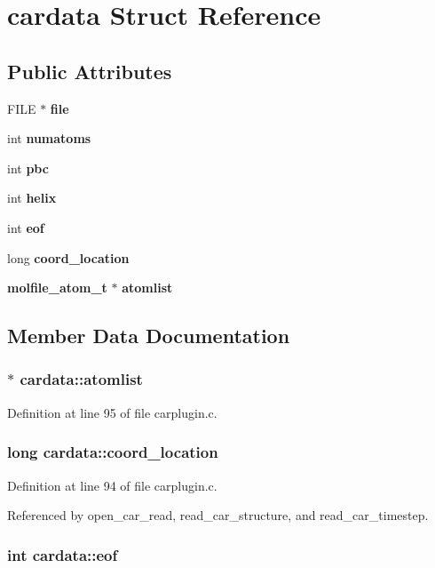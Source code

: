 \section{cardata  Struct Reference}
\label{structcardata}
\subsection*{Public Attributes}
\begin{CompactItemize}
\item 
FILE $\ast$ {\bf file}
\item 
int {\bf numatoms}
\item 
int {\bf pbc}
\item 
int {\bf helix}
\item 
int {\bf eof}
\item 
long {\bf coord\_\-location}
\item 
{\bf molfile\_\-atom\_\-t} $\ast$ {\bf atomlist}
\end{CompactItemize}


\subsection{Member Data Documentation}
\subsubsection{$\ast$ cardata::atomlist}\label{structcardata_m6}




Definition at line 95 of file carplugin.c.
\subsubsection{\setlength{\rightskip}{0pt plus 5cm}long cardata::coord\_\-location}\label{structcardata_m5}




Definition at line 94 of file carplugin.c.

Referenced by open\_\-car\_\-read, read\_\-car\_\-structure, and read\_\-car\_\-timestep.
\subsubsection{\setlength{\rightskip}{0pt plus 5cm}int cardata::eof}\label{structcardata_m4}




